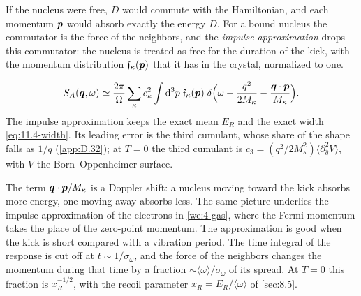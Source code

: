 If the nucleus were free, $D$ would commute with the Hamiltonian, and each momentum $\bm{p}$ would absorb exactly the energy $D$. For a bound nucleus the commutator is the force of the neighbors, and the \emph{impulse approximation} drops this commutator: the nucleus is treated as free for the duration of the kick, with the momentum distribution $\mathfrak{f}_\kappa(\bm{p})$ that it has in the crystal, normalized to one.
\begin{keyresult}
\begin{equation}
  S_A(\bm{q},\omega) \simeq \frac{2\pi}{\Omega}\sum_\kappa c_\kappa^2\int\mathrm{d}^3p\;\mathfrak{f}_\kappa(\bm{p})\;\delta\Bigl(\omega - \frac{q^2}{2M_\kappa} - \frac{\bm{q}\cdot\bm{p}}{M_\kappa}\Bigr) .
  \label{eq:11.4-IA}
\end{equation}
The impulse approximation keeps the exact mean $E_R$ and the exact width \cref{eq:11.4-width}. Its leading error is the third cumulant, whose share of the shape falls as $1/q$ (\cref{app:D.32}); at $T = 0$ the third cumulant is $c_3 = (q^2/2M_\kappa^2)\langle\partial_{\hat q}^2V\rangle$, with $V$ the Born--Oppenheimer surface.
\end{keyresult}
\noindent The term $\bm{q}\cdot\bm{p}/M_\kappa$ is a Doppler shift: a nucleus moving toward the kick absorbs more energy, one moving away absorbs less. The same picture underlies the impulse approximation of the electrons in \cref{we:4-gas}, where the Fermi momentum takes the place of the zero-point momentum. The approximation is good when the kick is short compared with a vibration period. The time integral of the response is cut off at $t \sim 1/\sigma_\omega$, and the force of the neighbors changes the momentum during that time by a fraction $\sim\langle\omega\rangle/\sigma_\omega$ of its spread. At $T = 0$ this fraction is $x_R^{-1/2}$, with the recoil parameter $x_R = E_R/\langle\omega\rangle$ of \cref{sec:8.5}.

